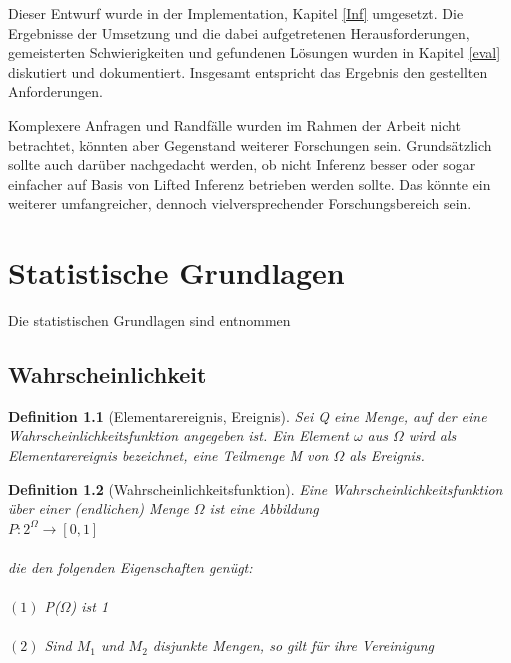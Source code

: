 \documentclass[a4paper, 11pt]{book}
\newtheorem{Def}{Definition }[section]
\begin{document}
{Dieser Entwurf wurde in der Implementation, Kapitel \ref{Inf} umgesetzt. Die Ergebnisse der Umsetzung und die dabei aufgetretenen Herausforderungen, gemeisterten Schwierigkeiten und gefundenen Lösungen wurden in Kapitel \ref{eval} diskutiert und dokumentiert. 
Insgesamt entspricht das Ergebnis den gestellten Anforderungen. 


Komplexere Anfragen und Randfälle wurden im Rahmen der Arbeit nicht betrachtet, könnten aber Gegenstand weiterer Forschungen sein. Grundsätzlich sollte auch darüber nachgedacht werden, ob nicht Inferenz besser oder sogar einfacher auf Basis von Lifted Inferenz betrieben werden sollte.
Das könnte ein weiterer umfangreicher, dennoch vielversprechender Forschungsbereich sein. 




\appendix{}

\chapter{Statistische Grundlagen}
Die statistischen Grundlagen sind \cite{BKI08} entnommen
\section{Wahrscheinlichkeit} 


\begin{Def}[Elementarereignis, Ereignis] 
Sei Q eine Menge, auf der eine Wahrscheinlichkeitsfunktion angegeben ist. Ein Element $\omega$ aus $\Omega$ wird als Elementarereignis bezeichnet, eine Teilmenge M von $\Omega$ als Ereignis.\\
\end{Def}

\begin{Def}[Wahrscheinlichkeitsfunktion] 
Eine Wahrscheinlichkeitsfunktion über einer (endlichen) Menge $\Omega$ ist eine Abbildung\\

$P : 2^{\Omega} \rightarrow [0, 1] $\\
\\die den folgenden Eigenschaften genügt:\\
\\$ (1 )$ P($\Omega$) ist 1\\
\\$ (2) $ Sind $M_{1}$ und $M_{2}$ disjunkte Mengen, so gilt für ihre Vereinigung\\


\end{Def}}
\end{document}
